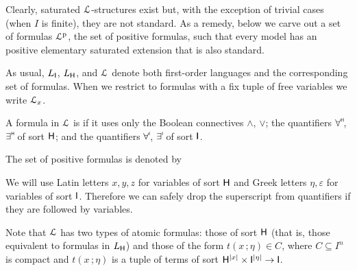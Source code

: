 \documentclass[10pt,oneside]{amsproc}
\renewcommand*{\emph}[1]{%
   \smash{\tikz[baseline]\node[rectangle, fill=teal!25, rounded corners, inner xsep=0.5ex, inner ysep=0.2ex, anchor=base, minimum height = 2.7ex]{\strut #1};}}
\newcommand\dangersign[1][3.5ex]{%
  \renewcommand\stacktype{L}%
  \scaleto{\stackon[1.9pt]{\Huge\color{red}$\triangle$}{\color{red}\bfseries\small !}}{#1}%
}
\begin{document}

Clearly, saturated ${\EuScript L}$-structures exist but, with the exception of trivial cases (when $I$ is finite), they are not standard.
As a remedy, below we carve out a set of formulas ${\EuScript L}^{\rm p}$, the set of positive formulas, such that every model has an positive elementary saturated extension that is also standard.

As usual, $L_{\sf I}$, $L_{\sf H}$, and ${\EuScript L}$ denote both first-order languages and the corresponding set of formulas.
When we restrict to formulas with a fix tuple of free variables we write ${\EuScript L}_x$.

\begin{definition}\label{def_LL}
  A formula in ${\EuScript L}$ is \emph{positive\/} if it uses only the Boolean connectives $\wedge$, $\vee$; the quantifiers $\forall\raisebox{1.1ex}{\scaleto{\sf H}{.8ex}\kern-.2ex}$, $\exists\raisebox{1.1ex}{\scaleto{\sf H}{.8ex}\kern-.2ex}$ of sort ${\sf H}$; and the quantifiers $\forall\raisebox{1.1ex}{\scaleto{\sf I}{.8ex}\kern-.2ex}$, $\exists\raisebox{1.1ex}{\scaleto{\sf I}{.8ex}\kern-.2ex}$ of sort ${\sf I}$.

  The set of positive formulas is denoted by \emph{${\EuScript L}^{\rm p}$.}

  We will use Latin letters $x,y,z$ for variables of sort ${\sf H}$ and Greek letters $\eta,\varepsilon$ for variables of sort ${\sf I}$.
  Therefore we can safely drop the superscript from quantifiers if they are followed by variables.
\end{definition}


Note that ${\EuScript L}$ has two types of atomic formulas: those of sort ${\sf H}$ (that is, those equivalent to formulas in $L_{\sf H}$) and those of the form $t(x\,;\eta)\in C$, where $C\subseteq I^n$ is compact and $t(x\,;\eta)$ is a tuple of terms of sort ${\sf H}^{|x|}\times {\sf I}^{|\eta|}\to {\sf I}$.
\end{document}
